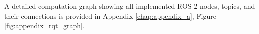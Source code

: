 A detailed computation graph showing all implemented ROS 2 nodes, topics, and their connections is provided in Appendix \ref{chap:appendix_a}, Figure \ref{fig:appendix_rqt_graph}.

